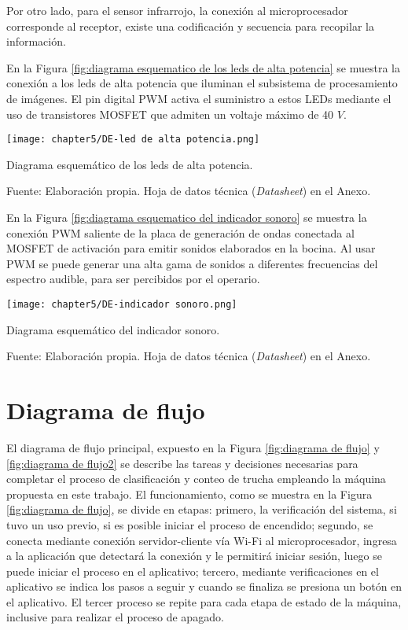 Por otro lado, para el sensor infrarrojo, la conexión al microprocesador corresponde al receptor, existe una codificación y secuencia para recopilar la información.

En la Figura \ref{fig:diagrama esquematico de los leds de alta potencia} se muestra la conexión a los leds de alta potencia que iluminan el subsistema de procesamiento de imágenes. El pin digital PWM activa el suministro a estos LEDs mediante el uso de transistores MOSFET que admiten un voltaje máximo de 40 $V$.

\begin{myfigure}[H]
	\footnotesize\centering
	\texttt{[image: chapter5/DE-led de alta potencia.png]}
	\caption{Diagrama esquemático de los leds de alta potencia.}
	\begin{myflushcenter}
		Fuente: Elaboración propia. Hoja de datos técnica (\textit{Datasheet}) en el Anexo.
	\end{myflushcenter}
	\label{fig:diagrama esquematico de los leds de alta potencia}
\end{myfigure}

En la Figura \ref{fig:diagrama esquematico del indicador sonoro} se muestra la conexión PWM saliente de la placa de generación de ondas conectada al MOSFET de activación para emitir sonidos elaborados en la bocina. Al usar PWM se puede generar una alta gama de sonidos a diferentes frecuencias del espectro audible, para ser percibidos por el operario.

\begin{myfigure}[H]
	\footnotesize\centering
	\texttt{[image: chapter5/DE-indicador sonoro.png]}
	\caption{Diagrama esquemático del indicador sonoro.}
	\begin{myflushcenter}
		Fuente: Elaboración propia. Hoja de datos técnica (\textit{Datasheet}) en el Anexo.
	\end{myflushcenter}
	\label{fig:diagrama esquematico del indicador sonoro}
\end{myfigure}


\section{Diagrama de flujo}

El diagrama de flujo principal, expuesto en la Figura \ref{fig:diagrama de flujo} y \ref{fig:diagrama de flujo2} se describe las tareas y decisiones necesarias para completar el proceso de clasificación y conteo de trucha empleando la máquina propuesta en este trabajo. El funcionamiento, como se muestra en la Figura \ref{fig:diagrama de flujo}, se divide en etapas: primero, la verificación del sistema, si tuvo un uso previo, si es posible iniciar el proceso de encendido; segundo, se conecta mediante conexión servidor-cliente vía Wi-Fi al microprocesador, ingresa a la aplicación que detectará la conexión y le permitirá iniciar sesión, luego se puede iniciar el proceso en el aplicativo; tercero, mediante verificaciones en el aplicativo se indica los pasos a seguir y cuando se finaliza se presiona un botón en el aplicativo. El tercer proceso se repite para cada etapa de estado de la máquina, inclusive para realizar el proceso de apagado.

